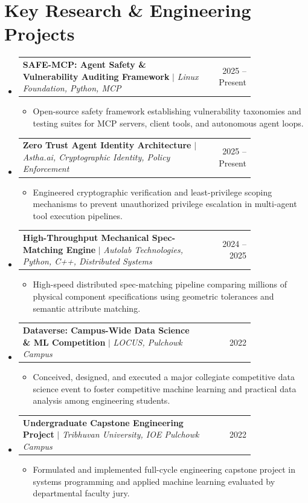 \documentclass[10pt,letterpaper]{article}
\makeatletter
\newcommand{\resumeProjectHeading}[2]{
  \vspace{0.5pt}
  \item[]
    \begin{tabular*}{\linewidth}[t]{p{0.80\linewidth}@{\extracolsep{\fill}}r}
      #1 & \small #2 \\
    \end{tabular*}\vspace{-5pt}
}
\makeatother
\begin{document}
\newpage

\section{Key Research \& Engineering Projects}
\begin{itemize}[leftmargin=*,label={}]
  \resumeProjectHeading
    {\textbf{SAFE-MCP: Agent Safety \& Vulnerability Auditing Framework} $|$ \emph{Linux Foundation, Python, MCP}}{2025 -- Present}
    \begin{itemize}[leftmargin=*,itemsep=1pt,topsep=1pt]
      \item Open-source safety framework establishing vulnerability taxonomies and testing suites for MCP servers, client tools, and autonomous agent loops.
    \end{itemize}

  \resumeProjectHeading
    {\textbf{Zero Trust Agent Identity Architecture} $|$ \emph{Astha.ai, Cryptographic Identity, Policy Enforcement}}{2025 -- Present}
    \begin{itemize}[leftmargin=*,itemsep=1pt,topsep=1pt]
      \item Engineered cryptographic verification and least-privilege scoping mechanisms to prevent unauthorized privilege escalation in multi-agent tool execution pipelines.
    \end{itemize}

  \resumeProjectHeading
    {\textbf{High-Throughput Mechanical Spec-Matching Engine} $|$ \emph{Autolab Technologies, Python, C++, Distributed Systems}}{2024 -- 2025}
    \begin{itemize}[leftmargin=*,itemsep=1pt,topsep=1pt]
      \item High-speed distributed spec-matching pipeline comparing millions of physical component specifications using geometric tolerances and semantic attribute matching.
    \end{itemize}

  \resumeProjectHeading
    {\textbf{Dataverse: Campus-Wide Data Science \& ML Competition} $|$ \emph{LOCUS, Pulchowk Campus}}{2022}
    \begin{itemize}[leftmargin=*,itemsep=1pt,topsep=1pt]
      \item Conceived, designed, and executed a major collegiate competitive data science event to foster competitive machine learning and practical data analysis among engineering students.
    \end{itemize}

  \resumeProjectHeading
    {\textbf{Undergraduate Capstone Engineering Project} $|$ \emph{Tribhuvan University, IOE Pulchowk Campus}}{2022}
    \begin{itemize}[leftmargin=*,itemsep=1pt,topsep=1pt]
      \item Formulated and implemented full-cycle engineering capstone project in systems programming and applied machine learning evaluated by departmental faculty jury.
    \end{itemize}
\end{itemize}
\end{document}
